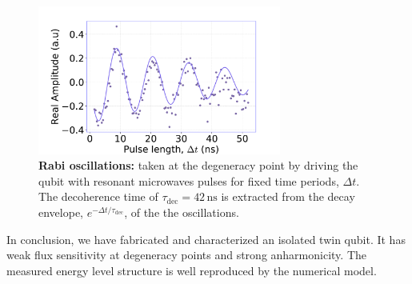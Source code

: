 \documentclass[%
reprint,
superscriptaddress,
bibnotes,
amsmath,
amssymb,
aps,
showkeys,
prb,
]{revtex4-2}
\newcommand{\iunit}[2]{\ensuremath{#1\,\text{#2}}}
\begin{document}
\begin{figure}
  \includegraphics[width=8cm]{fig5}
  \caption{\textbf{Rabi oscillations:}  taken at  the degeneracy point  by driving  the qubit
    with resonant microwaves pulses for fixed time periods, $ \Delta t $.  The decoherence time of
    $   \tau_{\text{dec}}  =   \iunit{42}{ns}  $   is   extracted  from   the  decay   envelope,
    $ e^{-\Delta t/\tau_{\text{dec}}} $, of the the oscillations. \label{fig:rabi}}
\end{figure}

In conclusion, we  have fabricated and  characterized an isolated  twin qubit.  It  has weak
flux  sensitivity at degeneracy  points and strong anharmonicity. The measured energy level structure is well reproduced by the numerical model.


\end{document}
